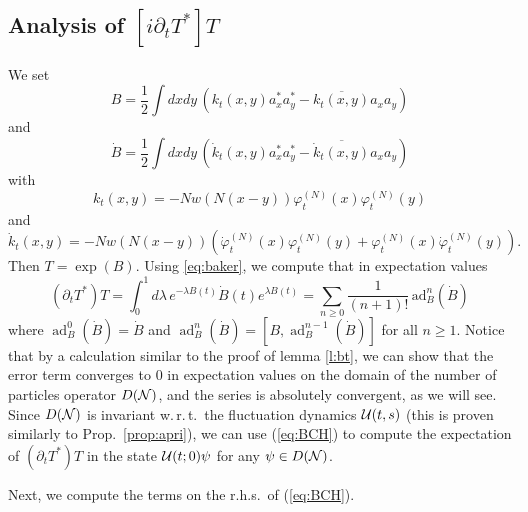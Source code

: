 \documentclass[11pt,a4paper]{article}
\newcommand{\done}{}
\newcommand{\cU}{{\cal U}}
\newcommand{\cN}{{\cal N}}
\newcommand{\ad}{\operatorname{ad}}	%
\newcommand{\di}{{d}}		%
\begin{document}
\subsection{Analysis of $[i \partial_t T^*] T$}

We set 
\[ B = \frac{1}{2} \int dx dy \, \left( k_t (x,y) a_x^* a_y^* - \overline{k_t (x,y)} a_x a_y \right) \]
and 
\[ \dot{B} =  \frac{1}{2} \int dx dy \, \left( \dot{k}_t (x,y) a_x^* a_y^* - \overline{\dot{k}_t (x,y)} a_x a_y \right) \]
with 
\[ k_t (x,y) = -N w(N(x-y)) \varphi_t^{(N)} (x) \varphi_t^{(N)} (y) \]
and
\[ \dot{k}_t (x,y) = - N w (N (x-y))  \left( \dot{\varphi}_t^{(N)} (x) \varphi_t^{(N)} (y) + \varphi_t^{(N)} (x) \dot{\varphi}_t^{(N)} (y) \right). \]
Then $T = \exp (B)$. Using \eqref{eq:baker}, we compute that in expectation values
\begin{equation}\label{eq:BCH} \left(\partial_t T^* \right) T = \int_0^1 \di\lambda\, e^{-\lambda B(t)} \dot B(t) e^{\lambda B(t)} = \sum_{n \geq 0} \frac{1}{(n+1)!}\,  \text{ad}^n_{B} (\dot{B}) \end{equation}
where $\ad^0_B (\dot B) = \dot B$ and $\ad^n_B (\dot B) = [B,\ad^{n-1}_B (\dot B)]$ for all $n \geq 1$. Notice that by a calculation similar to the proof of lemma \ref{l:bt}, we can show that the error term converges to $0$ in expectation values on the domain of the number of particles operator $D(\cN)$, and the series is absolutely convergent, as we will see. Since $D(\cN)$ is invariant w.\,r.\,t.\ the fluctuation dynamics $\cU (t,s)$ (this is proven similarly to Prop.\ \ref{prop:apri})\done{}, we can use (\ref{eq:BCH}) to compute the expectation of $(\partial_t T^*) T$ in the state $\cU (t;0) \psi$ for any $\psi \in D(\cN)$. 

Next, we compute the terms on the r.h.s.\ of (\ref{eq:BCH}).
\end{document}
